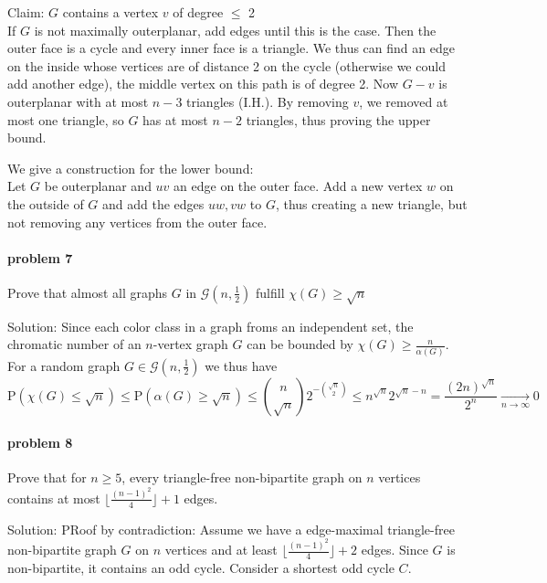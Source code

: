     \smallskip \noindent
    Claim: $G$ contains a vertex $v$ of degree $\leq$ 2 \\
    If $G$ is not maximally outerplanar, add edges until this is the case. 
    Then the outer face is a cycle and every inner face is a triangle. We thus
    can find an edge on the inside whose vertices are of distance 2 on the 
    cycle (otherwise we could add another edge), the middle vertex on this 
    path is of degree 2. Now $G -v$ is outerplanar with at most $n-3$ 
    triangles (I.H.). By removing $v$, we removed at most one triangle, 
    so $G$ has at most $n-2$ triangles, thus proving the upper bound.

    \smallskip \noindent
    We give a construction for the lower bound: \\
    Let $G$ be outerplanar and $uv$ an edge on the outer face.
    Add a new vertex $w$ on the outside of $G$ and add the edges $uw,vw$ to $G$,
    thus creating a new triangle, but not removing any vertices from the outer 
    face.


\paragraph{problem 7}
    Prove that almost all graphs $G$ in $\mathcal{G}(n,\frac{1}{2})$ fulfill
    $\chi(G) \geq \sqrt{n}$

    \smallskip \noindent
    Solution: Since each color class in a graph froms an independent set, the 
    chromatic number of an $n$-vertex graph $G$ can be bounded by 
    $\chi(G) \geq \frac{n}{\alpha(G)}$. \\
    For a random graph $G \in \mathcal{G}(n,\frac{1}{2})$ we thus have
    $$
        \text{P}(\chi(G) \leq \sqrt{n}) \leq \text{P}(\alpha(G) \geq \sqrt{n})
        \leq \binom{n}{\sqrt{n}} 2^{- \binom{\sqrt{n}}{2}} 
        \leq n^{\sqrt{n}} 2^{\sqrt{n} - n} 
        = \frac{(2n)^{\sqrt{n}}}{2^n} \underset{n \to \infty}{\rightarrow} 0
    $$

\paragraph{problem 8}
    Prove that for $n \geq 5$, every triangle-free non-bipartite graph on $n$ 
    vertices contains at most $\lfloor\frac{(n-1)^2}{4}\rfloor +1$ edges.

    \smallskip \noindent
    Solution: PRoof by contradiction: Assume we have a edge-maximal 
    triangle-free non-bipartite graph $G$ on $n$ vertices and at least 
    $\lfloor\frac{(n-1)^2}{4}\rfloor + 2$ edges. Since $G$ is non-bipartite,
    it contains an odd cycle. Consider a shortest odd cycle $C$.

